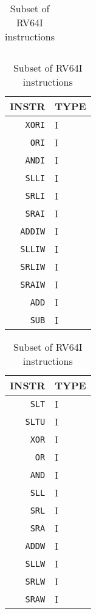 \begin{table}[!htb]
\begin{minipage}{.25\linewidth}
\begin{tabular}{r|l}
        \end{tabular}
    \end{minipage}%
    \begin{minipage}{.25\linewidth}
        \centering
        \begin{tabular}{r|l}
            \hline
            INSTR          & TYPE \\
            \hline
            \texttt{XORI}  & I    \\
            \texttt{ORI}   & I    \\
            \texttt{ANDI}  & I    \\
            \texttt{SLLI}  & I    \\
            \texttt{SRLI}  & I    \\
            \texttt{SRAI}  & I    \\
            \hline
            \texttt{ADDIW} & I    \\
            \texttt{SLLIW} & I    \\
            \texttt{SRLIW} & I    \\
            \texttt{SRAIW} & I    \\
            \hline
            \texttt{ADD}   & I    \\
            \texttt{SUB}   & I    \\

        \end{tabular}
    \end{minipage}%
    \begin{minipage}{0.25\linewidth}
        \centering
        \begin{tabular}{r|l}
            \hline
            INSTR         & TYPE \\
            \hline
            \texttt{SLT}  & I    \\
            \texttt{SLTU} & I    \\
            \texttt{XOR}  & I    \\
            \texttt{OR}   & I    \\
            \texttt{AND}  & I    \\
            \texttt{SLL}  & I    \\
            \texttt{SRL}  & I    \\
            \texttt{SRA}  & I    \\
            \hline
            \texttt{ADDW} & I    \\
            \texttt{SLLW} & I    \\
            \texttt{SRLW} & I    \\
            \texttt{SRAW} & I    \\
            \hline
        \end{tabular}
    \end{minipage}
    \caption[RV64I Instruction Subset]{Subset of RV64I instructions}
    \label{tab:rv64i-instructions}
\end{table}